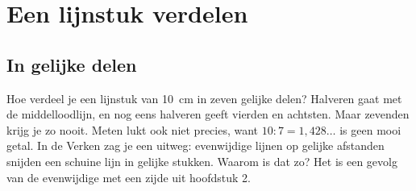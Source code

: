 
\begin{oefeningen}
\end{oefeningen}

\section{Een lijnstuk verdelen}

\subsection{In gelijke delen}

Hoe verdeel je een lijnstuk van 10~cm in zeven gelijke delen? Halveren gaat met de middelloodlijn, en nog eens halveren geeft vierden en achtsten. Maar zevenden krijg je zo nooit. Meten lukt ook niet precies, want $10 : 7 = 1{,}428\ldots$ is geen mooi getal. In de Verken zag je een uitweg: evenwijdige lijnen op gelijke afstanden snijden een schuine lijn in gelijke stukken. Waarom is dat zo? Het is een gevolg van de evenwijdige met een zijde uit hoofdstuk 2.

